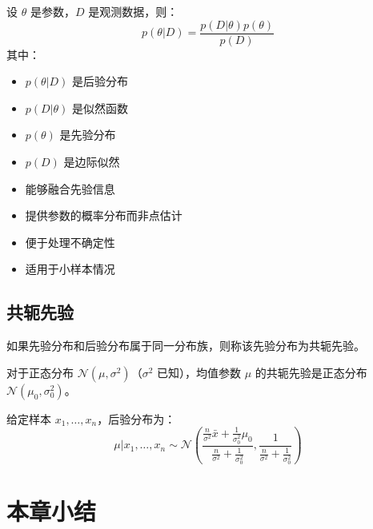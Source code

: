 \begin{definition}\label{def:bayesian-inference}
设 $\theta$ 是参数，$D$ 是观测数据，则：
\[
p(\theta|D) = \frac{p(D|\theta)p(\theta)}{p(D)}
\]
其中：
\begin{itemize}
    \item $p(\theta|D)$ 是后验分布
    \item $p(D|\theta)$ 是似然函数
    \item $p(\theta)$ 是先验分布
    \item $p(D)$ 是边际似然
\end{itemize}
\end{definition}

\begin{infobox}[title=贝叶斯推断的优势]
\begin{itemize}
    \item 能够融合先验信息
    \item 提供参数的概率分布而非点估计
    \item 便于处理不确定性
    \item 适用于小样本情况
\end{itemize}
\end{infobox}

\subsection{共轭先验}

\begin{definition}[共轭先验]\label{def:conjugate-prior}
如果先验分布和后验分布属于同一分布族，则称该先验分布为共轭先验。
\end{definition}

\begin{example}[正态分布的共轭先验]\label{ex:conjugate-normal}
对于正态分布 $\mathcal{N}(\mu, \sigma^2)$（$\sigma^2$ 已知），均值参数 $\mu$ 的共轭先验是正态分布 $\mathcal{N}(\mu_0, \sigma_0^2)$。

给定样本 $x_1, \ldots, x_n$，后验分布为：
\[
\mu|x_1,\ldots,x_n \sim \mathcal{N}\left(\frac{\frac{n}{\sigma^2}\bar{x} + \frac{1}{\sigma_0^2}\mu_0}{\frac{n}{\sigma^2} + \frac{1}{\sigma_0^2}}, \frac{1}{\frac{n}{\sigma^2} + \frac{1}{\sigma_0^2}}\right)
\]
\end{example}

\section{本章小结}\label{sec:chapter3-summary}


